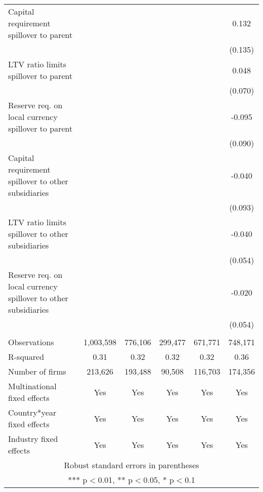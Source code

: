 \begin{tabular}{lccccc}
Capital requirement spillover to parent &  &  &  &  & 0.132 \\
 &  &  &  &  & (0.135) \\
LTV ratio limits spillover to parent &  &  &  &  & 0.048 \\
 &  &  &  &  & (0.070) \\
Reserve req. on local currency spillover to parent &  &  &  &  & -0.095 \\
 &  &  &  &  & (0.090) \\
Capital requirement spillover to other subsidiaries &  &  &  &  & -0.040 \\
 &  &  &  &  & (0.093) \\
LTV ratio limits spillover to other subsidiaries &  &  &  &  & -0.040 \\
 &  &  &  &  & (0.054) \\
Reserve req. on local currency spillover to other subsidiaries &  &  &  &  & -0.020 \\
 &  &  &  &  & (0.054) \\
 &  &  &  &  &  \\
Observations & 1,003,598 & 776,106 & 299,477 & 671,771 & 748,171 \\
R-squared & 0.31 & 0.32 & 0.32 & 0.32 & 0.36 \\
Number of firms & 213,626 & 193,488 & 90,508 & 116,703 & 174,356 \\
Multinational fixed effects & Yes & Yes & Yes & Yes & Yes \\
Country*year fixed effects & Yes & Yes & Yes & Yes & Yes \\
 Industry fixed effects & Yes & Yes & Yes & Yes & Yes \\ \hline
\multicolumn{6}{c}{ Robust standard errors in parentheses} \\
\multicolumn{6}{c}{ *** p$<$0.01, ** p$<$0.05, * p$<$0.1} \\
\end{tabular}
